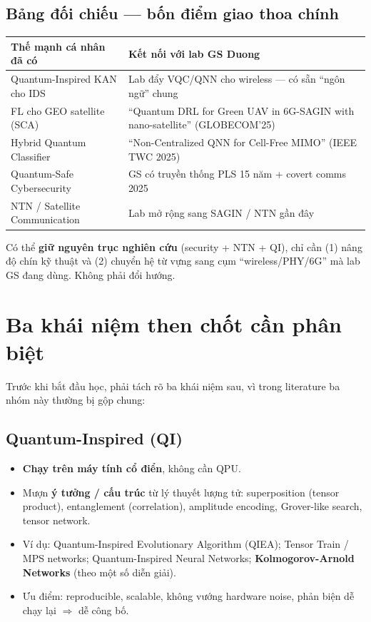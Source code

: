 \documentclass[11pt,a4paper]{article}
\begin{document}
\subsection{Bảng đối chiếu --- bốn điểm giao thoa chính}

\begin{longtable}{@{}p{6cm} p{9.5cm}@{}}
\toprule
\textbf{Thế mạnh cá nhân đã có} & \textbf{Kết nối với lab GS Duong} \\
\midrule
\endhead
Quantum-Inspired KAN cho IDS & Lab đẩy VQC/QNN cho wireless --- có sẵn ``ngôn ngữ'' chung \\
FL cho GEO satellite (SCA) & ``Quantum DRL for Green UAV in 6G-SAGIN with nano-satellite'' (GLOBECOM'25) \\
Hybrid Quantum Classifier & ``Non-Centralized QNN for Cell-Free MIMO'' (IEEE TWC 2025) \\
Quantum-Safe Cybersecurity & GS có truyền thống PLS 15 năm + covert comms 2025 \\
NTN / Satellite Communication & Lab mở rộng sang SAGIN / NTN gần đây \\
\bottomrule
\end{longtable}

\begin{keybox}
Có thể \textbf{giữ nguyên trục nghiên cứu} (security + NTN + QI), chỉ cần (1) nâng độ chín kỹ thuật và (2) chuyển hệ từ vựng sang cụm ``wireless/PHY/6G'' mà lab GS đang dùng. Không phải đổi hướng.
\end{keybox}

\section{Ba khái niệm then chốt cần phân biệt}

Trước khi bắt đầu học, phải tách rõ ba khái niệm sau, vì trong literature ba nhóm này thường bị gộp chung:

\subsection{Quantum-Inspired (QI)}
\begin{itemize}
  \item \textbf{Chạy trên máy tính cổ điển}, không cần QPU.
  \item Mượn \textbf{ý tưởng / cấu trúc} từ lý thuyết lượng tử: superposition (tensor product), entanglement (correlation), amplitude encoding, Grover-like search, tensor network.
  \item Ví dụ: Quantum-Inspired Evolutionary Algorithm (QIEA); Tensor Train / MPS networks; Quantum-Inspired Neural Networks; \textbf{Kolmogorov-Arnold Networks} (theo một số diễn giải).
  \item Ưu điểm: reproducible, scalable, không vướng hardware noise, phản biện dễ chạy lại $\Rightarrow$ dễ công bố.
\end{itemize}
\end{document}
